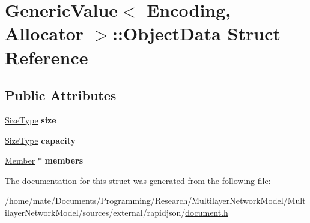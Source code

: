 \hypertarget{structGenericValue_1_1ObjectData}{}\section{Generic\+Value$<$ Encoding, Allocator $>$\+:\+:Object\+Data Struct Reference}
\label{structGenericValue_1_1ObjectData}
\subsection*{Public Attributes}
\begin{DoxyCompactItemize}
\item 
\hyperlink{rapidjson_8h_a5ed6e6e67250fadbd041127e6386dcb5}{Size\+Type} {\bfseries size}\hypertarget{structGenericValue_1_1ObjectData_a8aa09c430b245b9bb0745a1ab38201d5}{}\label{structGenericValue_1_1ObjectData_a8aa09c430b245b9bb0745a1ab38201d5}

\item 
\hyperlink{rapidjson_8h_a5ed6e6e67250fadbd041127e6386dcb5}{Size\+Type} {\bfseries capacity}\hypertarget{structGenericValue_1_1ObjectData_a22b8d8b01d52db71471f0d4c990cb93b}{}\label{structGenericValue_1_1ObjectData_a22b8d8b01d52db71471f0d4c990cb93b}

\item 
\hyperlink{classGenericValue_a7ccf27c44058b4c11c3efc6473afb886}{Member} $\ast$ {\bfseries members}\hypertarget{structGenericValue_1_1ObjectData_a108be865f16e4c028f2354b1474a1ec8}{}\label{structGenericValue_1_1ObjectData_a108be865f16e4c028f2354b1474a1ec8}

\end{DoxyCompactItemize}


The documentation for this struct was generated from the following file\+:\begin{DoxyCompactItemize}
\item 
/home/mate/\+Documents/\+Programming/\+Research/\+Multilayer\+Network\+Model/\+Multilayer\+Network\+Model/sources/external/rapidjson/\hyperlink{document_8h}{document.\+h}\end{DoxyCompactItemize}
